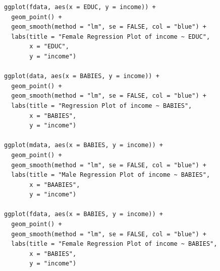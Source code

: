 \documentclass{article}[13pt]
\begin{document}
\begin{verbatim}
ggplot(fdata, aes(x = EDUC, y = income)) +
  geom_point() +
  geom_smooth(method = "lm", se = FALSE, col = "blue") +
  labs(title = "Female Regression Plot of income ~ EDUC",
       x = "EDUC",
       y = "income")

ggplot(data, aes(x = BABIES, y = income)) +
  geom_point() +
  geom_smooth(method = "lm", se = FALSE, col = "blue") +
  labs(title = "Regression Plot of income ~ BABIES",
       x = "BABIES",
       y = "income")

ggplot(mdata, aes(x = BABIES, y = income)) +
  geom_point() +
  geom_smooth(method = "lm", se = FALSE, col = "blue") +
  labs(title = "Male Regression Plot of income ~ BABIES",
       x = "BAABIES",
       y = "income")

ggplot(fdata, aes(x = BABIES, y = income)) +
  geom_point() +
  geom_smooth(method = "lm", se = FALSE, col = "blue") +
  labs(title = "Female Regression Plot of income ~ BABIES",
       x = "BABIES",
       y = "income")

\end{verbatim}
\end{document}
